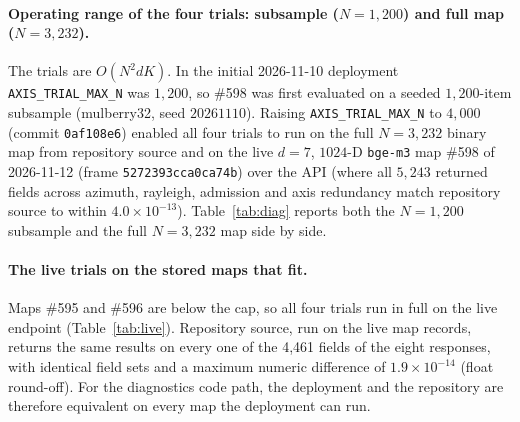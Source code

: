\documentclass[11pt,a4paper]{article}
\theoremstyle{plain}
\theoremstyle{remark}
\begin{document}
\paragraph{Operating range of the four trials: subsample ($N=1{,}200$) and full map ($N=3{,}232$).} The trials are $O(N^2dK)$. In the initial 2026-11-10 deployment \texttt{AXIS\_TRIAL\_MAX\_N} was $1{,}200$, so \#598 was first evaluated on a seeded $1{,}200$-item subsample (mulberry32, seed $20261110$). Raising \texttt{AXIS\_TRIAL\_MAX\_N} to $4{,}000$ (commit \texttt{0af108e6}) enabled all four trials to run on the full $N=3{,}232$ binary map from repository source and on the live $d=7$, $1024$-D \texttt{bge-m3} map \#598 of 2026-11-12 (frame \texttt{5272393cca0ca74b}) over the API (where all $5{,}243$ returned fields across azimuth, rayleigh, admission and axis redundancy match repository source to within $4.0\times10^{-13}$). Table~\ref{tab:diag} reports both the $N=1{,}200$ subsample and the full $N=3{,}232$ map side by side.

\paragraph{The live trials on the stored maps that fit.} Maps \#595 and \#596 are below the cap, so all four trials run in full on the live endpoint (Table~\ref{tab:live}). Repository source, run on the live map records, returns the same results on every one of the 4{,}461 fields of the eight responses, with identical field sets and a maximum numeric difference of $1.9\times10^{-14}$ (float round-off). For the diagnostics code path, the deployment and the repository are therefore equivalent on every map the deployment can run.

\begin{table}[h]\centering\small
{}
\caption{The four live trials on the two stored maps below the cap (live endpoint, operator key, default $K=40$). Every value equals the repository-source result. Azimuth is not admitted on either map: its de-atomized null is not size-matched and its Holm verdicts are not reproducible across seeds.}
\label{tab:live}
\end{table}
\end{document}
